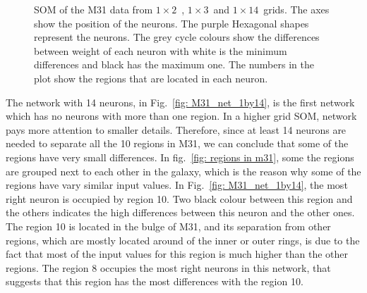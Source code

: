         \begin{figure}
            \hfill
             \hfill
            \caption{SOM of the M31 data from $1\times2$~, $1\times3$~and $1\times14$~grids. The axes show the position of the neurons. The purple Hexagonal shapes represent the neurons. The grey cycle colours show the differences between weight of each neuron with white is the minimum differences and black has the maximum one. The numbers in the plot show the regions that are located in each neuron.}
            \label{fig: M31_nets_1d}
        \end{figure}
        
        The network with 14 neurons, in Fig.~\ref{fig: M31_net_1by14}, is the first network which has no neurons with more than one region.
        In a higher grid SOM, network pays more attention to smaller details.
        Therefore, since at least 14 neurons are needed to separate all the 10 regions in M31, we can conclude that some of the regions have very small differences.
        In fig.~\ref{fig: regions in m31}, some the regions are grouped next to each other in the galaxy, which is the reason why some of the regions have vary similar input values.
        In Fig.~\ref{fig: M31_net_1by14}, the most right neuron is occupied by region 10.
        Two black colour between this region and the others indicates the high differences between this neuron and the other ones.
        The region 10 is located in the bulge of M31, and its separation from other regions, which are mostly located around of the inner or outer rings, is due to the fact that most of the input values for this region is much higher than the other regions.
        The region 8 occupies the most right neurons in this network, that suggests that this region has the most differences with the region 10.
        
